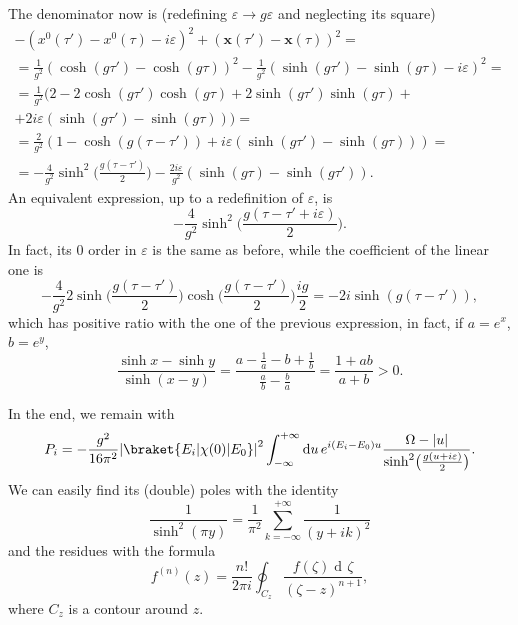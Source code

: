 \documentclass[a4paper,12pt]{book}
\newcommand{\ap}[1]{\textormath{\textsuperscript{#1}}{^{\mathrm{#1}}}}
\DeclarePairedDelimiter{\abs}{\lvert}{\rvert}
\renewcommand{\vec}{\mathbf}
\newcommand{\dd}{\mathop{\mathrm{d}\!}{}}
\renewcommand{\epsilon}{\varepsilon}
\theoremstyle{definition}
\theoremstyle{remark}
\begin{document}
The denominator now is (redefining $\epsilon\to g\epsilon$ and neglecting its square)
\begin{multline*}
-(x^0(\tau')-x^0(\tau)-i\epsilon)^2+(\vec x(\tau')-\vec x(\tau))^2=\\
=\frac1{g^2}(\cosh(g\tau')-\cosh(g\tau))^2-\frac1{g^2}(\sinh(g\tau')-\sinh(g\tau)-i\epsilon)^2=\\
=\frac1{g^2}(2-2\cosh(g\tau')\cosh(g\tau)+2\sinh(g\tau')\sinh(g\tau)+\\
+2i\epsilon(\sinh(g\tau')-\sinh(g\tau)))=\\
=\frac2{g^2}(1-\cosh(g(\tau-\tau'))+i\epsilon(\sinh(g\tau')-\sinh(g\tau)))=\\
=-\frac4{g^2}\sinh^2\biggl(\frac{g(\tau-\tau')}{2}\biggr)-\frac{2i\epsilon}{g^2}(\sinh(g\tau)-\sinh(g\tau')).
\end{multline*}
An equivalent expression, up to a redefinition of $\epsilon$, is
\[-\frac4{g^2}\sinh^2\biggl(\frac{g(\tau-\tau'+i\epsilon)}2\biggr).\]
In fact, its 0\ap{th} order in $\epsilon$ is the same as before, while the coefficient of the linear one is
\[-\frac4{g^2}2\sinh\biggl(\frac{g(\tau-\tau')}2\biggr)\cosh\biggl(\frac{g(\tau-\tau')}2\biggr)\frac{ig}2=-2i\sinh(g(\tau-\tau')),\]
which has positive ratio with the one of the previous expression, in fact, if $a=e^x$, $b=e^y$,
\[\frac{\sinh x-\sinh y}{\sinh(x-y)}=\frac{a-\frac1a-b+\frac1b}{\frac ab-\frac ba}=\frac{1+ab}{a+b}>0.\]

In the end, we remain with
\[P_i=-\frac{g^2}{16\pi^2}\abs*{\braket{E_i|\chi(0)|E_0}}^2\int_{-\infty}^{+\infty}\dd u\,e^{i(E_i-E_0)u}\frac{\Omega-\abs{u}}{\sinh^2\bigl(\frac{g(u+i\epsilon)}2\bigr)}.\]
We can easily find its (double) poles with the identity
\[\frac1{\sinh^2(\pi y)}=\frac1{\pi^2}\sum_{k=-\infty}^{+\infty}\frac1{(y+ik)^2}\]
and the residues with the formula
\[f^{(n)}(z)=\frac{n!}{2\pi i}\oint_{C_z}\frac{f(\zeta)\dd\zeta}{(\zeta-z)^{n+1}},\]
where $C_z$ is a contour around $z$.
\end{document}
